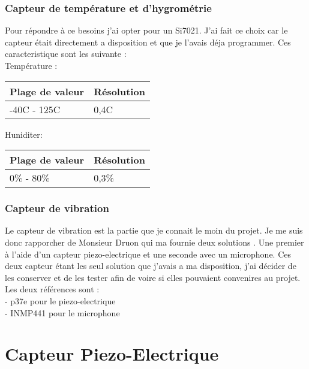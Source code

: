 \documentclass[5pt]{article}
\begin{document}
\subsubsection{Capteur de température et d'hygrométrie }
Pour répondre à ce besoins j'ai opter pour un Si7021. J'ai fait ce choix car le capteur était directement a disposition et que je l'avais déja programmer. Ces caracteristique sont les suivante :\\
Température :\\
\begin{center}
    \begin{tabular}{|l|l|}
	\hline
	    Plage de valeur & Résolution \\
	\hline
	    -40C - 125C & 0,4C \\
	\hline
    \end{tabular}
\end{center}


Huniditer:\\
\begin{center}
    \begin{tabular}{|l|l|}
	\hline
	    Plage de valeur & Résolution \\
	\hline
	    0\% - 80\% & 0,3\% \\
	\hline
    \end{tabular}
\end{center}

\subsubsection{Capteur de vibration}
Le capteur de vibration est la partie que je connait le moin du projet. Je me suis donc rapporcher de Monsieur Druon qui ma fournie deux solutions . Une premier à l'aide d'un capteur piezo-electrique et une seconde avec un  microphone. Ces deux capteur étant les seul solution que j'avais a ma disposition, j'ai décider de les conserver et de les tester afin de voire si elles pouvaient convenires au projet.\\
Les deux références sont :\\
- p37e pour le piezo-electrique\\
- INMP441 pour le microphone\\

\section{Capteur Piezo-Electrique}
\end{document}
